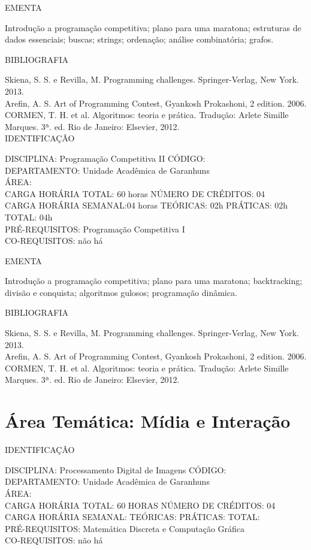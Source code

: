 \documentclass[
	12pt,				%
	openright,			%
  oneside,     %
	a4paper,			%
	english,			%
	french,				%
	spanish,			%
	brazil				%
	]{abntex2}
\begin{document}
\begin{apendicesenv}
EMENTA 

Introdução a programação competitiva; plano para uma maratona;  estruturas de dados essenciais; buscas; strings; ordenação; análise combinatória; grafos.

BIBLIOGRAFIA 

Skiena, S. S. e Revilla, M. Programming challenges. Springer-Verlag, New York. 2013.\\
Arefin, A. S. Art of Programming Contest, Gyankosh Prokashoni, 2 edition. 2006.\\
CORMEN, T. H. et al. Algoritmos: teoria e prática. Tradução: Arlete Simille Marques. 3ª. ed. Rio de Janeiro: Elsevier, 2012.\\

\newpage IDENTIFICAÇÃO

DISCIPLINA: Programação Competitiva II CÓDIGO: \\
DEPARTAMENTO: Unidade Acadêmica de Garanhuns \\
ÁREA: \\
CARGA HORÁRIA TOTAL: 60 horas NÚMERO DE CRÉDITOS: 04\\
CARGA HORÁRIA SEMANAL:04 horas TEÓRICAS: 02h PRÁTICAS: 02h TOTAL: 04h\\
PRÉ-REQUISITOS: Programação Competitiva I\\
CO-REQUISITOS: não há

EMENTA 

Introdução a programação competitiva; plano para uma maratona; backtracking; divisão e conquista; algoritmos gulosos; programação dinâmica.

BIBLIOGRAFIA 

Skiena, S. S. e Revilla, M. Programming challenges. Springer-Verlag, New York. 2013.\\
Arefin, A. S. Art of Programming Contest, Gyankosh Prokashoni, 2 edition. 2006.\\
CORMEN, T. H. et al. Algoritmos: teoria e prática. Tradução: Arlete Simille Marques. 3ª. ed. Rio de Janeiro: Elsevier, 2012.\\
\newpage

\section*{Área Temática: Mídia e Interação}

IDENTIFICAÇÃO

DISCIPLINA: Processamento Digital de Imagens CÓDIGO:\\ 
DEPARTAMENTO: Unidade Acadêmica de Garanhuns\\
ÁREA: \\
CARGA HORÁRIA TOTAL: 60 HORAS NÚMERO DE CRÉDITOS: 04\\
CARGA HORÁRIA SEMANAL: TEÓRICAS: PRÁTICAS: TOTAL: \\
PRÉ-REQUISITOS: Matemática Discreta e Computação Gráfica\\
CO-REQUISITOS: não há


\end{apendicesenv}
\end{document}
